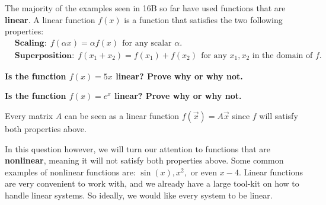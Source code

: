 

The majority of the examples seen in 16B so far have used functions that are \textbf{linear}.
A linear function $f(x)$ is a function that satisfies the two following properties:
\begin{align*}
  &\textbf{Scaling:} \ \ f(\alpha x) = \alpha f(x) \ \ \text{for any scalar $\alpha.$} \\
  &\textbf{Superposition:} \ \ f(x_{1} + x_{2}) = f(x_{1}) + f(x_{2}) \ \ \text{for any $x_{1}, x_{2}$ in the domain of $f.$}
\end{align*}

\begin{enumerate}
  \qitem \textbf{Is the function $f(x) = 5x$ linear? Prove why or why not.}

  \ws {
    \vspace{75px}
  }

  \qitem \textbf{Is the function $f(x) = e^{x}$ linear? Prove why or why not.}

  \ws {
    \vspace{75px}
  }

\end{enumerate}

Every matrix $A$ can be seen as a linear function $f(\vec{x}) = A \vec{x}$ since $f$ will satisfy both properties above.

In this question however, we will turn our attention to functions that are \textbf{nonlinear}, meaning it will not satisfy both properties above.
Some common examples of nonlinear functions are: $\sin(x), x^{2},$ or even $x - 4.$
Linear functions are very convenient to work with, and we already have a large tool-kit on how to handle linear systems.
So ideally, we would like every system to be linear.

